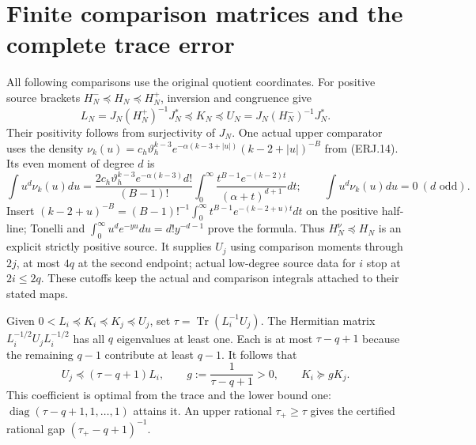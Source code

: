 \documentclass[11pt]{article}
\newcommand{\Tr}{\operatorname{Tr}}\newcommand{\diag}{\operatorname{diag}}
\begin{document}
\section{Finite comparison matrices and the complete trace error}
All following comparisons use the original quotient coordinates.
For positive source brackets $H_N^-\preceq H_N\preceq H_N^+$,
inversion and congruence give
\[
 L_N=J_N(H_N^+)^{-1}J_N^*\preceq K_N\preceq
 U_N=J_N(H_N^-)^{-1}J_N^*.\tag{ERJ.18}
\]
Their positivity follows from surjectivity of $J_N$.
One actual upper comparator uses the density
$\nu_k(u)=c_h\vartheta_h^{k-3}e^{-\alpha(k-3+|u|)}
(k-2+|u|)^{-B}$ from (ERJ.14). Its even moment of degree $d$ is
\[
 \int u^d\nu_k(u)du=
 \frac{2c_h\vartheta_h^{k-3}e^{-\alpha(k-3)}d!}{(B-1)!}
 \int_0^\infty\frac{t^{B-1}e^{-(k-2)t}}{(\alpha+t)^{d+1}}dt;
 \qquad \int u^d\nu_k(u)du=0\ (d\text{ odd}).\tag{ERJ.19}
\]
Insert $(k-2+u)^{-B}=(B-1)!^{-1}\int_0^\infty
t^{B-1}e^{-(k-2+u)t}dt$ on the positive half-line; Tonelli and
$\int_0^\infty u^de^{-yu}du=d!y^{-d-1}$ prove the formula.
Thus $H_N^\nu\preceq H_N$ is an explicit strictly positive source.
It supplies $U_j$ using comparison moments through $2j$, at most
$4q$ at the second endpoint; actual low-degree source data for $i$
stop at $2i\le2q$. These cutoffs keep the actual and comparison
integrals attached to their stated maps.

Given $0<L_i\preceq K_i\preceq K_j\preceq U_j$, set
$\tau=\Tr(L_i^{-1}U_j)$. The Hermitian matrix
$L_i^{-1/2}U_jL_i^{-1/2}$ has all $q$ eigenvalues at least one.
Each is at most $\tau-q+1$ because the remaining $q-1$ contribute
at least $q-1$. It follows that
\[
 U_j\preceq(\tau-q+1)L_i,\qquad
 g:=\frac1{\tau-q+1}>0,\qquad K_i\succeq gK_j.
 \tag{ERJ.20}
\]
This coefficient is optimal from the trace and the lower bound one:
$\diag(\tau-q+1,1,\ldots,1)$ attains it. An upper rational
$\tau_+\ge\tau$ gives the certified rational gap
$(\tau_+-q+1)^{-1}$.
\end{document}

